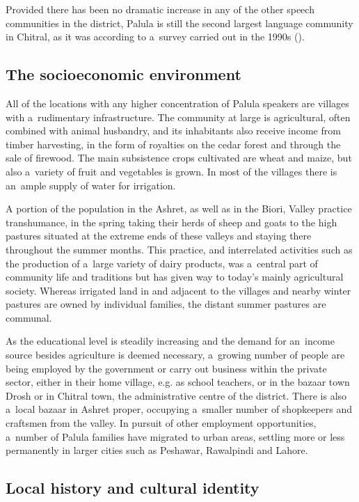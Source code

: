 Provided there has been no dramatic increase in any of the other speech communities in the district, Palula is still the second largest language community in Chitral, as it was according to a~survey carried out in the 1990s (\citealt[11]{decker1992a}). 

\subsection{The socioeconomic environment}
\label{subsec:1-2-2}

All of the locations with any higher concentration of Palula speakers are villages with a~rudimentary infrastructure. The community at large is agricultural, often combined with animal husbandry, and its inhabitants also receive income from timber harvesting, in the form of royalties on the cedar forest and through the sale of firewood. The main subsistence crops cultivated are wheat and maize, but also a~variety of fruit and vegetables is grown. In most of the villages there is an~ample supply of water for irrigation. 


A portion of the population in the Ashret, as well as in the Biori, Valley practice transhumance, in the spring taking their herds of sheep and goats to the high pastures situated at the extreme ends of these valleys and staying there throughout the summer months. This practice, and interrelated activities such as the production of a~large variety of dairy products, was a~central part of community life and traditions but has given way to today's mainly agricultural society. Whereas irrigated land in and adjacent to the villages and nearby winter pastures are owned by individual families, the distant summer pastures are communal.


As the educational level is steadily increasing and the demand for an~income source besides agriculture is deemed necessary, a~growing number of people are being employed by the government or carry out business within the private sector, either in their home village, e.g. as school teachers, or in the bazaar town Drosh or in Chitral town, the administrative centre of the district. There is also a~local bazaar in Ashret proper, occupying a~smaller number of shopkeepers and craftsmen from the valley. In pursuit of other employment opportunities, a~number of Palula families have migrated to urban areas, settling more or less permanently in larger cities such as Peshawar, Rawalpindi and Lahore.

\subsection{Local history and cultural identity}\label{Local history and cultural identity}
\label{subsec:1-2-3}

